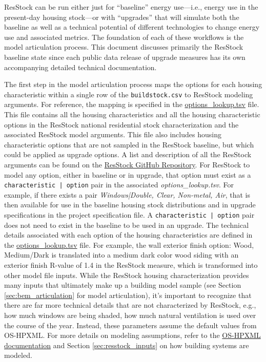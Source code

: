 ResStock can be run either just for ``baseline'' energy use---i.e., energy use in the present-day housing stock---or with ``upgrades'' that will simulate both the baseline as well as a technical potential of different technologies to change energy use and associated metrics. The foundation of each of these workflows is the model articulation process. This document discusses primarily the ResStock baseline state since each public data release of upgrade measures has its own accompanying detailed technical documentation. 

The first step in the model articulation process maps the options for each housing characteristic within a single row of the \texttt{buildstock.csv} to ResStock modeling arguments. For reference, the mapping is specified in the \href{https://github.com/NREL/resstock/blob/v3.3.0/resources/options_lookup.tsv}{options\_lookup.tsv} file. This file contains all the housing characteristics and all the housing characteristic options in the ResStock national residential stock characterization and the associated ResStock model arguments. This file also includes housing characteristic options that are not sampled in the ResStock baseline, but which could be applied as upgrade options. A list and description of all the ResStock arguments can be found on the \href{https://github.com/NREL/resstock/tree/v3.3.0/measures/ResStockArguments}{ResStock GitHub Repository}. For ResStock to model any option, either in baseline or in upgrade, that option must exist as a \texttt{characteristic | option}  pair in the associated \textit{options\_lookup.tsv}. For example, if there exists a pair \textit{Windows|Double, Clear, Non-metal, Air}, that is then available for use in the baseline housing stock distributions and in upgrade specifications in the project specification file. A \texttt{characteristic | option} pair does not need to exist in the baseline to be used in an upgrade. The technical details associated with each option of the housing characteristics are defined in the \href{https://github.com/NREL/resstock/blob/v3.3.0/resources/options_lookup.tsv}{options\_lookup.tsv} file. For example, the wall exterior finish option: Wood, Medium/Dark is translated into a medium dark color wood siding with an exterior finish R-value of 1.4 in the ResStock measure, which is transformed into other model file inputs. While the ResStock housing characterization provides many inputs that ultimately make up a building model sample (see Section \ref{sec:bem_articulation} for model articulation), it’s important to recognize that there are far more technical details that are not characterized by ResStock, e.g., how much windows are being shaded, how much natural ventilation is used over the course of the year. Instead, these parameters assume the default values from OS-HPXML. For more details on modeling assumptions, refer to the \href{https://openstudio-hpxml.readthedocs.io/en/v1.8.1/}{OS-HPXML documentation} and Section \ref{sec:resstock_inputs} on how building systems are modeled.


